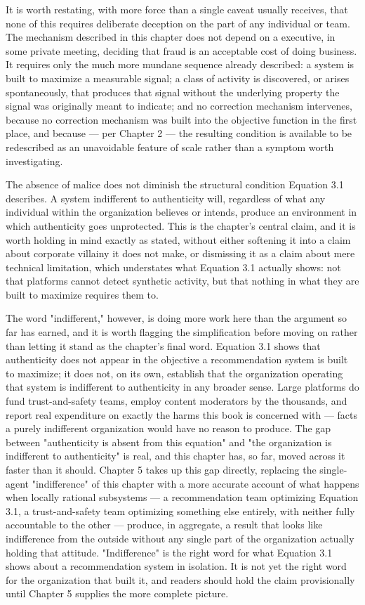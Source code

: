 \documentclass[12pt,a4paper]{book}
\begin{document}
It is worth restating, with more force than a single caveat usually receives, that none of this requires deliberate deception on the part of any individual or team. The mechanism described in this chapter does not depend on a executive, in some private meeting, deciding that fraud is an acceptable cost of doing business. It requires only the much more mundane sequence already described: a system is built to maximize a measurable signal; a class of activity is discovered, or arises spontaneously, that produces that signal without the underlying property the signal was originally meant to indicate; and no correction mechanism intervenes, because no correction mechanism was built into the objective function in the first place, and because — per Chapter 2 — the resulting condition is available to be redescribed as an unavoidable feature of scale rather than a symptom worth investigating.

The absence of malice does not diminish the structural condition Equation 3.1 describes. A system indifferent to authenticity will, regardless of what any individual within the organization believes or intends, produce an environment in which authenticity goes unprotected. This is the chapter's central claim, and it is worth holding in mind exactly as stated, without either softening it into a claim about corporate villainy it does not make, or dismissing it as a claim about mere technical limitation, which understates what Equation 3.1 actually shows: not that platforms cannot detect synthetic activity, but that nothing in what they are built to maximize requires them to.

The word "indifferent," however, is doing more work here than the argument so far has earned, and it is worth flagging the simplification before moving on rather than letting it stand as the chapter's final word. Equation 3.1 shows that authenticity does not appear in the objective a recommendation system is built to maximize; it does not, on its own, establish that the organization operating that system is indifferent to authenticity in any broader sense. Large platforms do fund trust-and-safety teams, employ content moderators by the thousands, and report real expenditure on exactly the harms this book is concerned with — facts a purely indifferent organization would have no reason to produce. The gap between "authenticity is absent from this equation" and "the organization is indifferent to authenticity" is real, and this chapter has, so far, moved across it faster than it should. Chapter 5 takes up this gap directly, replacing the single-agent "indifference" of this chapter with a more accurate account of what happens when locally rational subsystems — a recommendation team optimizing Equation 3.1, a trust-and-safety team optimizing something else entirely, with neither fully accountable to the other — produce, in aggregate, a result that looks like indifference from the outside without any single part of the organization actually holding that attitude. "Indifference" is the right word for what Equation 3.1 shows about a recommendation system in isolation. It is not yet the right word for the organization that built it, and readers should hold the claim provisionally until Chapter 5 supplies the more complete picture.
\end{document}
